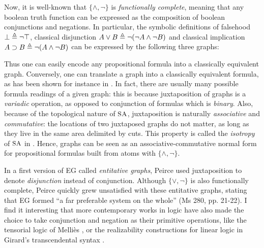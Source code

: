Now, it is well-known that $\{\land,\neg\}$ is \emph{functionally complete},
meaning that any boolean truth function can be expressed as the composition of
boolean conjunctions and negations. In particular, the symbolic definitions of
falsehood $\bot \triangleq \neg\top$, classical disjunction $A \lor B \triangleq
\neg(\neg A \land \neg B)$ and classical implication $A \supset B \triangleq \neg (A
\land \neg B)$ can be expressed by the following three graphs:
Thus one can easily encode any propositional formula into a classically
equivalent graph. Conversely, one can translate a graph into a classically
equivalent formula, as has been shown for instance in
. In fact, there are usually many
possible formula readings of a given graph: this is because juxtaposition of
graphs is a \emph{variadic} operation, as opposed to conjunction of formulas
which is \emph{binary}. Also, because of the topological nature of $\small\textsc{SA}$,
juxtaposition is naturally \emph{associative} and \emph{commutative}: the
locations of two juxtaposed graphs do not matter, as long as they live in the
same area delimited by cuts. This property is called the \emph{isotropy} of
$\small\textsc{SA}$ in \cite{minghui_graphical_2019}. Hence, graphs can be seen as an
associative-commutative normal form for propositional formulas built from atoms
with $\{\land,\neg\}$.

\begin{remark}
  
  In a first version of EG called \emph{entitative graphs}, Peirce used
  juxtaposition to denote \emph{disjunction} instead of conjunction. Although
  $\{\lor,\neg\}$ is also functionally complete, Peirce quickly grew unsatisfied
  with these entitative graphs, stating that EG formed ``a far preferable system
  on the whole'' (Ms 280, pp. 21-22). I find it interesting that more
  contemporary works in logic have also made the choice to take conjunction and
  negation as their primitive operations, like the tensorial logic of Melliès
  \cite{mellies_micrological_2017}, or the realizability constructions for
  linear logic in Girard's transcendental syntax \cite{eng_stellar_2020}.
\end{remark}

